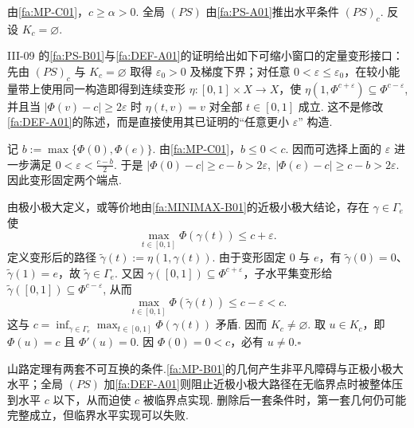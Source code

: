 \begin{FAProof}
由\autoref{fa:MP-C01}，\(\displaystyle c\geqslant\alpha>0\). 全局 \(\displaystyle(PS)\) 由\autoref{fa:PS-A01}推出水平条件 \(\displaystyle(PS)_c\). 反设 \(\displaystyle K_c=\varnothing\).

III-09 的\autoref{fa:PS-B01}与\autoref{fa:DEF-A01}的证明给出如下可缩小窗口的定量变形接口：先由 \(\displaystyle(PS)_c\) 与 \(\displaystyle K_c=\varnothing\) 取得 \(\displaystyle\varepsilon_0>0\) 及梯度下界；对任意 \(\displaystyle0<\varepsilon\leqslant\varepsilon_0\)，在较小能量带上使用同一构造即得到连续变形 \(\displaystyle\eta:[0,1]\times X\to X\)，使
\(\displaystyle \eta(1,\Phi^{c+\varepsilon}) \subseteq \Phi^{c-\varepsilon}\),
并且当 \(\displaystyle|\Phi(v)-c|\geqslant2\varepsilon\) 时 \(\displaystyle\eta(t,v)=v\) 对全部 \(\displaystyle t\in[0,1]\) 成立. 这不是修改\autoref{fa:DEF-A01}的陈述，而是直接使用其已证明的“任意更小 \(\displaystyle\varepsilon\)” 构造.

记
\(\displaystyle b:=\max\{\Phi(0),\Phi(e)\}\).
由\autoref{fa:MP-C01}，\(\displaystyle b\leqslant0<c\). 因而可选择上面的 \(\displaystyle\varepsilon\) 进一步满足
\(\displaystyle 0<\varepsilon<\frac{c-b}{2}\).
于是
\(\displaystyle |\Phi(0)-c| \geqslant c-b > 2\varepsilon, \; |\Phi(e)-c| \geqslant c-b > 2\varepsilon\).
因此变形固定两个端点.

由极小极大定义，或等价地由\autoref{fa:MINIMAX-B01}的近极小极大结论，存在 \(\displaystyle\gamma\in\Gamma_e\) 使
\[
\max_{t\in[0,1]}\Phi(\gamma(t))
\leqslant
c+\varepsilon.
\]
定义变形后的路径
\(\displaystyle \widetilde\gamma(t) := \eta(1,\gamma(t))\).
由于变形固定 \(\displaystyle0\) 与 \(\displaystyle e\)，有 \(\displaystyle\widetilde\gamma(0)=0\)、\(\displaystyle\widetilde\gamma(1)=e\)，故 \(\displaystyle\widetilde\gamma\in\Gamma_e\). 又因 \(\displaystyle\gamma([0,1])\subseteq\Phi^{c+\varepsilon}\)，子水平集变形给
\(\displaystyle \widetilde\gamma([0,1]) \subseteq \Phi^{c-\varepsilon}\),
从而
\[
\max_{t\in[0,1]}\Phi(\widetilde\gamma(t))
\leqslant
c-\varepsilon
<
c.
\]
这与 \(\displaystyle c=\inf_{\gamma\in\Gamma_e}\max_{t\in[0,1]}\Phi(\gamma(t))\) 矛盾. 因而 \(\displaystyle K_c\neq\varnothing\). 取 \(\displaystyle u\in K_c\)，即 \(\displaystyle\Phi(u)=c\) 且 \(\displaystyle\Phi'(u)=0\). 因 \(\displaystyle\Phi(0)=0<c\)，必有 \(\displaystyle u\neq0\).\hfill\(\square\)
\end{FAProof}

\begin{FARemark}
山路定理有两套不可互换的条件.\autoref{fa:MP-B01}的几何产生非平凡障碍与正极小极大水平；全局 \(\displaystyle(PS)\) 加\autoref{fa:DEF-A01}则阻止近极小极大路径在无临界点时被整体压到水平 \(\displaystyle c\) 以下，从而迫使 \(\displaystyle c\) 被临界点实现. 删除后一套条件时，第一套几何仍可能完整成立，但临界水平实现可以失败.
\end{FARemark}

